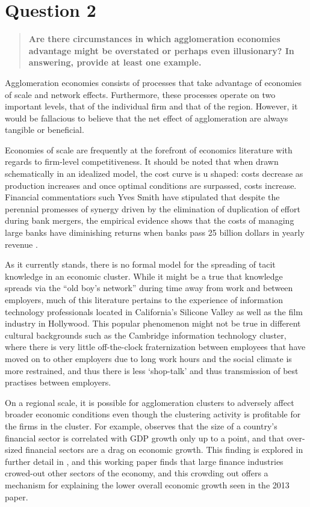 \documentclass[12pt,letterpaper,notitlepage,onecolumn,final,openbib]{article}
\begin{document}
\section{Question 2}
\begin{quotation}
	\textbf{Are there circumstances in which agglomeration economies advantage might be overstated or perhaps even illusionary? In answering, provide at least one example.}
\end{quotation}

Agglomeration economies consists of processes that take advantage of economies of scale and network effects.  Furthermore, these processes operate on two important levels, that of the individual firm and that of the region.  However, it would be fallacious to believe that the net effect of agglomeration are always tangible or beneficial.   

Economies of scale are frequently at the forefront of economics literature \cite{Panzar1977} with regards to firm-level competitiveness.  It should be noted that when drawn schematically in an idealized model, the cost curve is u shaped: costs decrease as production increases and once optimal conditions are surpassed, costs increase.  Financial commentatiors such Yves Smith have stipulated that despite the perennial promesses of synergy driven by the elimination of duplication of effort during bank mergers, the empirical evidence shows that the costs of managing large banks have diminishing returns when banks pass 25 billion dollars in yearly revenue \cite{Smith2010}.  


As it currently stands, there is no formal model for the spreading of tacit knowledge in an economic cluster.  While it might be a true that knowledge spreads via the ``old boy's network'' during time away from work and between employers, much of this literature pertains to the experience of information technology professionals located in California's Silicone Valley as well as the film industry in Hollywood.  This popular phenomenon might not be true in different cultural backgrounds such as the Cambridge information technology cluster, where there is very little off-the-clock fraternization between employees that have moved on to other employers due to long work hours and the social climate is more restrained, and thus there is less `shop-talk' and thus transmission of best practises between employers.       

On a regional scale, it is possible for agglomeration clusters to adversely affect broader economic conditions even though the clustering activity is profitable for the firms in the cluster.  For example,  observes that the size of a country's financial sector is correlated with GDP growth only up to a point, and that over-sized financial sectors are a drag on economic growth.  This finding is explored in further detail in , and this working paper finds that large finance industries crowed-out other sectors of the economy, and this crowding out offers a mechanism for explaining the lower overall economic growth seen in the 2013 paper. 
\end{document}

